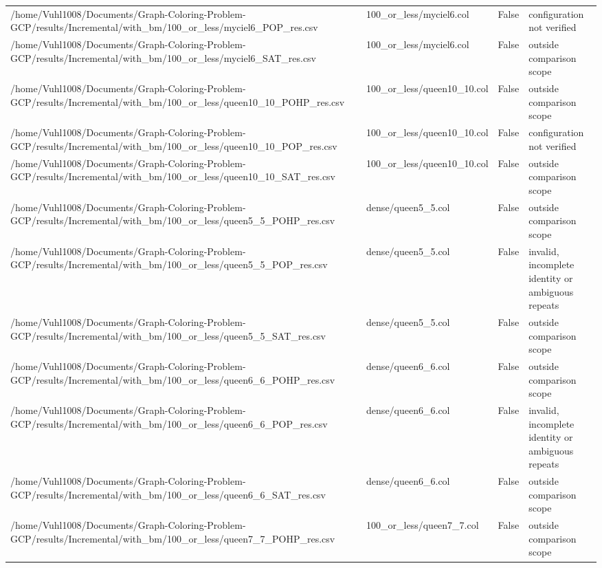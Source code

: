 \begin{table}[htbp]
\begin{tabular}{llll}
/home/Vuhl1008/Documents/Graph-Coloring-Problem-GCP/results/Incremental/with\_bm/100\_or\_less/myciel6\_POP\_res.csv & 100\_or\_less/myciel6.col & False & configuration not verified \\
/home/Vuhl1008/Documents/Graph-Coloring-Problem-GCP/results/Incremental/with\_bm/100\_or\_less/myciel6\_SAT\_res.csv & 100\_or\_less/myciel6.col & False & outside comparison scope \\
/home/Vuhl1008/Documents/Graph-Coloring-Problem-GCP/results/Incremental/with\_bm/100\_or\_less/queen10\_10\_POHP\_res.csv & 100\_or\_less/queen10\_10.col & False & outside comparison scope \\
/home/Vuhl1008/Documents/Graph-Coloring-Problem-GCP/results/Incremental/with\_bm/100\_or\_less/queen10\_10\_POP\_res.csv & 100\_or\_less/queen10\_10.col & False & configuration not verified \\
/home/Vuhl1008/Documents/Graph-Coloring-Problem-GCP/results/Incremental/with\_bm/100\_or\_less/queen10\_10\_SAT\_res.csv & 100\_or\_less/queen10\_10.col & False & outside comparison scope \\
/home/Vuhl1008/Documents/Graph-Coloring-Problem-GCP/results/Incremental/with\_bm/100\_or\_less/queen5\_5\_POHP\_res.csv & dense/queen5\_5.col & False & outside comparison scope \\
/home/Vuhl1008/Documents/Graph-Coloring-Problem-GCP/results/Incremental/with\_bm/100\_or\_less/queen5\_5\_POP\_res.csv & dense/queen5\_5.col & False & invalid, incomplete identity or ambiguous repeats \\
/home/Vuhl1008/Documents/Graph-Coloring-Problem-GCP/results/Incremental/with\_bm/100\_or\_less/queen5\_5\_SAT\_res.csv & dense/queen5\_5.col & False & outside comparison scope \\
/home/Vuhl1008/Documents/Graph-Coloring-Problem-GCP/results/Incremental/with\_bm/100\_or\_less/queen6\_6\_POHP\_res.csv & dense/queen6\_6.col & False & outside comparison scope \\
/home/Vuhl1008/Documents/Graph-Coloring-Problem-GCP/results/Incremental/with\_bm/100\_or\_less/queen6\_6\_POP\_res.csv & dense/queen6\_6.col & False & invalid, incomplete identity or ambiguous repeats \\
/home/Vuhl1008/Documents/Graph-Coloring-Problem-GCP/results/Incremental/with\_bm/100\_or\_less/queen6\_6\_SAT\_res.csv & dense/queen6\_6.col & False & outside comparison scope \\
/home/Vuhl1008/Documents/Graph-Coloring-Problem-GCP/results/Incremental/with\_bm/100\_or\_less/queen7\_7\_POHP\_res.csv & 100\_or\_less/queen7\_7.col & False & outside comparison scope \\

\end{tabular}
\end{table}

